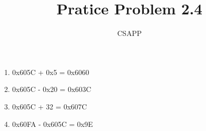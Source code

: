 \documentclass{article}
\title{Pratice Problem 2.4}
\author{CSAPP}
\begin{document}
    \maketitle
    \begin{enumerate}[label=(\Alph*)]
        \item 0x605C + 0x5    = 0x6060
        \item 0x605C - 0x20   = 0x603C
        \item 0x605C + 32     = 0x607C
        \item 0x60FA - 0x605C = 0x9E
    \end{enumerate}
\end{document}
